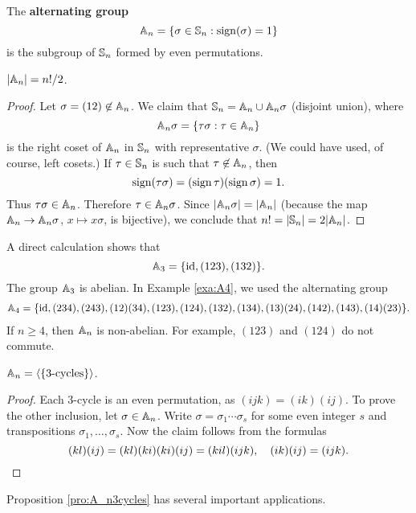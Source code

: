\begin{definition}   
The \textbf{alternating group}
\[
\mathbb{A}_n=\{\sigma\in\mathbb{S}_n:\operatorname{sign}(\sigma)=1\}
\]
is the subgroup of $\mathbb{S}_n$ formed by even permutations. 
\end{definition}

\begin{proposition}
$|\mathbb{A}_n|=n!/2$.
\end{proposition}

\begin{proof}
Let $\sigma=(12)\not\in\mathbb{A}_n$. We claim that 
$\mathbb{S}_n=\mathbb{A}_n\cup\mathbb{A}_n\sigma$ (disjoint union), where 
\[
\mathbb{A}_n\sigma=\{\tau\sigma:\tau\in\mathbb{A}_n\}
\]
is the right coset of $\mathbb{A}_n$ in $\mathbb{S}_n$ with 
representative $\sigma$. (We could have used, of course, left cosets.)
If 
$\tau\in\mathbb{S}_n$ is such that $\tau\not\in\mathbb{A}_n$, then 
\[
\operatorname{sign}(\tau\sigma)=(\operatorname{sign}\tau)(\operatorname{sign}\sigma)=1.
\]
Thus 
$\tau\sigma\in\mathbb{A}_n$. Therefore $\tau\in\mathbb{A}_n\sigma$. Since  $|\mathbb{A}_n\sigma|=|\mathbb{A}_
n|$ (because the map $\mathbb{A}_n\to\mathbb{A}_n\sigma$, $x\mapsto x\sigma$, is bijective), we conclude that 
$n!=|\mathbb{S}_n|=2|\mathbb{A}_n|$.
\end{proof}

A direct calculation shows that  
\[
\mathbb{A}_3=\{\operatorname{id},(123),(132)\}.
\]
The group $\mathbb{A}_3$ is abelian.
In Example \ref{exa:A4}, we used the alternating group 
\begin{multline*}
\mathbb{A}_4=\{\operatorname{id},(234),(243),(12)(34),(123),(124),(132),(134),(13)(24),(142),(143),(14)(23)\}.
\end{multline*}
If $n\geq4$, then $\mathbb{A}_n$ is non-abelian. For example, 
$(123)$ and $(124)$ do not commute. 

\begin{proposition}
\label{pro:A_n3cycles}
$\mathbb{A}_n=\langle\{\text{3-cycles}\}\rangle$.
\end{proposition}

\begin{proof}
Each 3-cycle is an even permutation, as $(ijk)=(ik)(ij)$. 
To prove the other inclusion, let $\sigma\in\mathbb{A}_n$.
Write $\sigma=\sigma_1\cdots\sigma_s$ for some even integer $s$ 
and transpositions $\sigma_1,\dots,\sigma_s$. 
Now the claim follows from the formulas 
\[
(kl)(ij)=(kl)(ki)(ki)(ij)=(kil)(ijk),\quad
(ik)(ij)=(ijk).\qedhere
\]
 \end{proof}

Proposition \ref{pro:A_n3cycles} has several 
important applications. 

